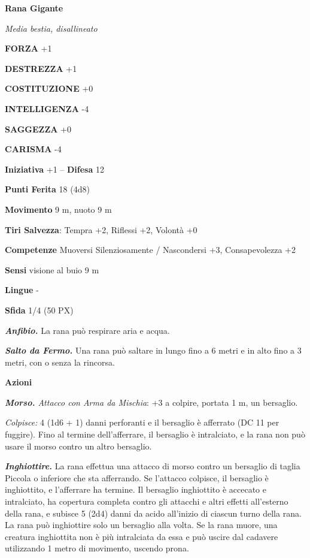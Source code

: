 \begin{multicols}{2}
	\medskip\textbf{Rana Gigante}

	\textit{Media bestia, disallineato}

	\textbf{FORZA} +1

	\textbf{DESTREZZA} +1

	\textbf{COSTITUZIONE} +0

	\textbf{INTELLIGENZA} -4

	\textbf{SAGGEZZA} +0

	\textbf{CARISMA} -4

	\textbf{Iniziativa} +1 -- \textbf{Difesa} 12

	\textbf{Punti Ferita} 18 (4d8)

	\textbf{Movimento} 9 m, nuoto 9 m

	\textbf{Tiri Salvezza}: Tempra +2, Riflessi +2, Volontà +0

	\textbf{Competenze} Muoversi Silenziosamente / Nascondersi +3, Consapevolezza +2

	\textbf{Sensi} visione al buio 9 m

	\textbf{Lingue} -

	\textbf{Sfida} 1/4 (50 PX)

	\textit{\textbf{Anfibio.}} La rana può respirare aria e acqua.

	\textit{\textbf{Salto da Fermo.}} Una rana può saltare in lungo fino a 6 metri e in alto fino a 3 metri, con o senza la rincorsa.

	\textbf{Azioni}

	\textit{\textbf{Morso.} Attacco con Arma da Mischia}: +3 a colpire, portata 1 m, un bersaglio.

	\textit{Colpisce:} 4 (1d6 + 1) danni perforanti e il bersaglio è afferrato (DC 11 per fuggire). Fino al termine dell'afferrare, il bersaglio è intralciato, e la rana non può usare il morso contro un altro bersaglio.

	\textit{\textbf{Inghiottire.}} La rana effettua una attacco di morso contro un bersaglio di taglia Piccola o inferiore che sta afferrando. Se l'attacco colpisce, il bersaglio è inghiottito, e l'afferrare ha termine. Il bersaglio inghiottito è accecato e intralciato, ha copertura completa contro gli attacchi e altri effetti all'esterno della rana, e subisce 5 (2d4) danni da acido all'inizio di ciascun turno della rana. La rana può inghiottire solo un bersaglio alla volta. Se la rana muore, una creatura inghiottita non è più intralciata da essa e può uscire dal cadavere utilizzando 1 metro di movimento, uscendo prona.


\end{multicols}
